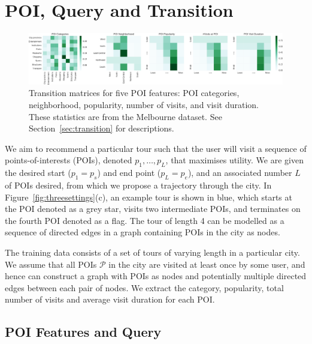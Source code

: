 \section{POI, Query and Transition}
\label{sec:method}

\begin{figure}[t]
\includegraphics[width=\columnwidth]{fig/poi_transmat.png}
\caption{Transition matrices for five POI features: POI categories, neighborhood, popularity, number of visits, and visit duration. These statistics are from the Melbourne dataset. See Section~\ref{sec:transition} for descriptions.}
\label{fig:transmat}
\end{figure}


We aim to recommend a particular tour such that the user will visit a sequence of points-of-interests (POIs), denoted $p_1, \ldots, p_L$, that maximises utility. We are given the desired start ($p_1=p_s$) and end point ($p_L=p_e$), and an associated number $L$ of POIs desired, from which we propose a trajectory through the city. In Figure~\ref{fig:threesettings}(c), an example tour is shown in blue, which starts at the POI denoted as a grey star, visits two intermediate POIs, and terminates on the fourth POI denoted as a flag. The tour of length 4 can be modelled as a sequence of directed edges in a graph containing POIs in the city as nodes.

The training data consists of a set of tours of varying length in a particular city. We assume that all POIs $\mathcal{P}$ in the city are visited at least once by some user, and hence can construct a graph with POIs as nodes and potentially multiple directed edges between each pair of nodes. We extract the category, popularity, total number of visits and average visit duration for each POI.



\subsection{POI Features and Query}
\label{sec:poifeature}

